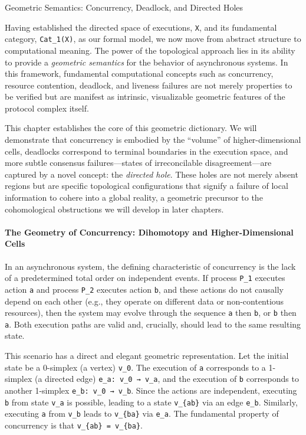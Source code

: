 \documentclass[
]{article}
\begin{document}
\protect{}\label{chapter-2-3-Geometric_Semantics__Concurrency__Deadlo}{}

Geometric Semantics: Concurrency, Deadlock, and Directed Holes

Having established the directed space of executions, \texttt{X}, and its
fundamental category, \texttt{Cat\_1(X)}, as our formal model, we now
move from abstract structure to computational meaning. The power of the
topological approach lies in its ability to provide a \emph{geometric
semantics} for the behavior of asynchronous systems. In this framework,
fundamental computational concepts such as concurrency, resource
contention, deadlock, and liveness failures are not merely properties to
be verified but are manifest as intrinsic, visualizable geometric
features of the protocol complex itself.

This chapter establishes the core of this geometric dictionary. We will
demonstrate that concurrency is embodied by the ``volume'' of
higher-dimensional cells, deadlocks correspond to terminal boundaries in
the execution space, and more subtle consensus failures---states of
irreconcilable disagreement---are captured by a novel concept: the
\emph{directed hole}. These holes are not merely absent regions but are
specific topological configurations that signify a failure of local
information to cohere into a global reality, a geometric precursor to
the cohomological obstructions we will develop in later chapters.

\paragraph{The Geometry of Concurrency: Dihomotopy and
Higher-Dimensional
Cells}\label{the-geometry-of-concurrency-dihomotopy-and-higher-dimensional-cells}

In an asynchronous system, the defining characteristic of concurrency is
the lack of a predetermined total order on independent events. If
process \texttt{P\_1} executes action \texttt{a} and process
\texttt{P\_2} executes action \texttt{b}, and these actions do not
causally depend on each other (e.g., they operate on different data or
non-contentious resources), then the system may evolve through the
sequence \texttt{a} then \texttt{b}, or \texttt{b} then \texttt{a}. Both
execution paths are valid and, crucially, should lead to the same
resulting state.

This scenario has a direct and elegant geometric representation. Let the
initial state be a 0-simplex (a vertex) \texttt{v\_0}. The execution of
\texttt{a} corresponds to a 1-simplex (a directed edge)
\texttt{e\_a:\ v\_0\ →\ v\_a}, and the execution of \texttt{b}
corresponds to another 1-simplex \texttt{e\_b:\ v\_0\ →\ v\_b}. Since
the actions are independent, executing \texttt{b} from state
\texttt{v\_a} is possible, leading to a state \texttt{v\_\{ab\}} via an
edge \texttt{e\textquotesingle{}\_b}. Similarly, executing \texttt{a}
from \texttt{v\_b} leads to \texttt{v\_\{ba\}} via
\texttt{e\textquotesingle{}\_a}. The fundamental property of concurrency
is that \texttt{v\_\{ab\}\ =\ v\_\{ba\}}.
\end{document}
